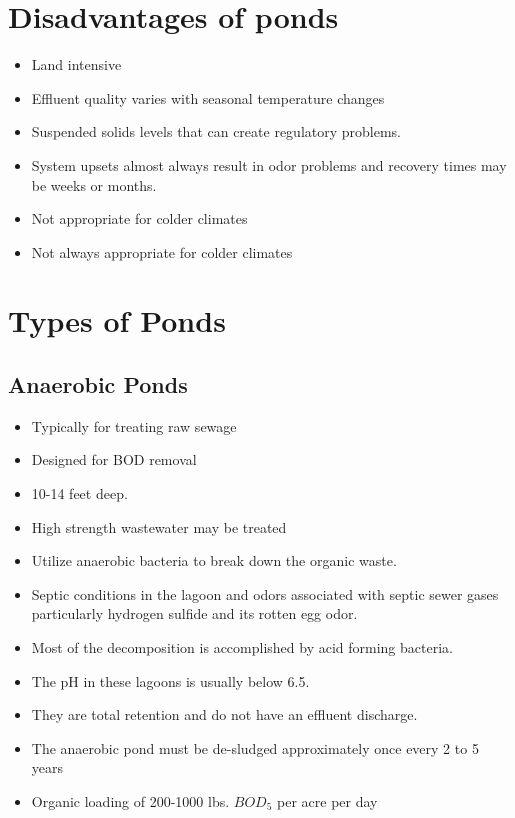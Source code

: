 \section{Disadvantages of ponds}	
\begin{itemize}	
\item Land intensive
\item Effluent quality varies with seasonal temperature changes
\item Suspended solids levels that can create regulatory problems.
\item System upsets almost always result in odor problems and recovery times may be weeks or months.
\item Not appropriate for colder climates
\item Not always appropriate for colder climates
\end{itemize} 

\section{Types of Ponds}	

\subsection{Anaerobic Ponds}	

\begin{itemize}	
\item Typically for treating raw sewage
\item Designed for BOD removal
\item 10-14 feet deep. 
\item High strength wastewater may be treated
\item Utilize anaerobic bacteria to break down the organic waste. 
\item Septic conditions in the lagoon and odors associated with septic sewer gases particularly hydrogen sulfide and its rotten egg odor. 
\item Most of the decomposition is accomplished by acid forming bacteria. 
\item The pH in these lagoons is usually below 6.5. 
\item They are total retention and do not have an effluent discharge. 
\item The anaerobic pond must be de-sludged approximately once every 2 to 5 years
\item Organic loading of 200-1000 lbs. $BOD_5$ per acre per day
\end{itemize}


